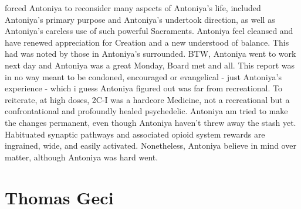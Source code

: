 \documentclass[12pt]{book}
\begin{document}
forced Antoniya to reconsider many aspects of Antoniya's life, included Antoniya's primary purpose and Antoniya's undertook direction, as well as Antoniya's careless use of such powerful Sacraments. Antoniya feel cleansed and have renewed appreciation for Creation and a new understood of balance. This had was noted by those in Antoniya's surrounded. BTW, Antoniya went to work next day and Antoniya was a great Monday, Board met and all. This report was in no way meant to be condoned, encouraged or evangelical - just Antoniya's experience - which i guess Antoniya figured out was far from recreational. To reiterate, at high doses, 2C-I was a hardcore Medicine, not a recreational but a confrontational and profoundly healed psychedelic. Antoniya am tried to make the changes permanent, even though Antoniya haven't threw away the stash yet. Habituated synaptic pathways and associated opioid system rewards are ingrained, wide, and easily activated. Nonetheless, Antoniya believe in mind over matter, although Antoniya was hard went.



\chapter{Thomas Geci}
\end{document}
